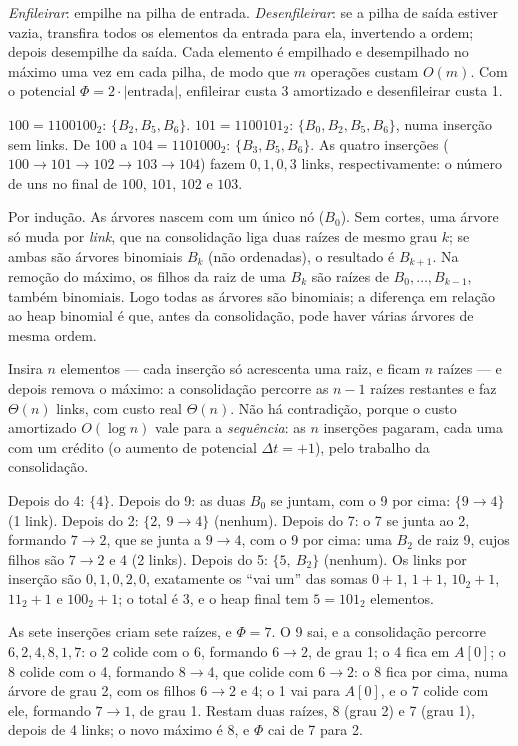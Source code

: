  \emph{Enfileirar}: empilhe na pilha de entrada. \emph{Desenfileirar}: se a pilha de saída estiver vazia, transfira todos os elementos da entrada para ela, invertendo a ordem; depois desempilhe da saída. Cada elemento é empilhado e desempilhado no máximo uma vez em cada pilha, de modo que $m$ operações custam $O(m)$. Com o potencial $\Phi=2\cdot|\text{entrada}|$, enfileirar custa 3 amortizado e desenfileirar custa 1.

 $100=1100100_2$: $\{B_2,B_5,B_6\}$. $101=1100101_2$: $\{B_0,B_2,B_5,B_6\}$, numa inserção sem links. De 100 a $104=1101000_2$: $\{B_3,B_5,B_6\}$. As quatro inserções ($100\to101\to102\to103\to104$) fazem $0,1,0,3$ links, respectivamente: o número de uns no final de $100$, $101$, $102$ e $103$.

 Por indução. As árvores nascem com um único nó ($B_0$). Sem cortes, uma árvore só muda por \emph{link}, que na consolidação liga duas raízes de mesmo grau $k$; se ambas são árvores binomiais $B_k$ (não ordenadas), o resultado é $B_{k+1}$. Na remoção do máximo, os filhos da raiz de uma $B_k$ são raízes de $B_0,\dots,B_{k-1}$, também binomiais. Logo todas as árvores são binomiais; a diferença em relação ao heap binomial é que, antes da consolidação, pode haver várias árvores de mesma ordem.

 Insira $n$ elementos --- cada inserção só acrescenta uma raiz, e ficam $n$ raízes --- e depois remova o máximo: a consolidação percorre as $n-1$ raízes restantes e faz $\Theta(n)$ links, com custo real $\Theta(n)$. Não há contradição, porque o custo amortizado $O(\log n)$ vale para a \emph{sequência}: as $n$ inserções pagaram, cada uma com um crédito (o aumento de potencial $\Delta t=+1$), pelo trabalho da consolidação.

 Depois do 4: $\{4\}$. Depois do 9: as duas $B_0$ se juntam, com o 9 por cima: $\{9\to4\}$ (1 link). Depois do 2: $\{2,\ 9\to4\}$ (nenhum). Depois do 7: o 7 se junta ao 2, formando $7\to2$, que se junta a $9\to4$, com o 9 por cima: uma $B_2$ de raiz 9, cujos filhos são $7\to2$ e 4 (2 links). Depois do 5: $\{5,\ B_2\}$ (nenhum). Os links por inserção são $0,1,0,2,0$, exatamente os ``vai um'' das somas $0+1$, $1+1$, $10_2+1$, $11_2+1$ e $100_2+1$; o total é 3, e o heap final tem $5=101_2$ elementos.

 As sete inserções criam sete raízes, e $\Phi=7$. O 9 sai, e a consolidação percorre $6,2,4,8,1,7$: o 2 colide com o 6, formando $6\to2$, de grau 1; o 4 fica em $A[0]$; o 8 colide com o 4, formando $8\to4$, que colide com $6\to2$: o 8 fica por cima, numa árvore de grau 2, com os filhos $6\to2$ e 4; o 1 vai para $A[0]$, e o 7 colide com ele, formando $7\to1$, de grau 1. Restam duas raízes, 8 (grau 2) e 7 (grau 1), depois de 4 links; o novo máximo é 8, e $\Phi$ cai de 7 para 2.
